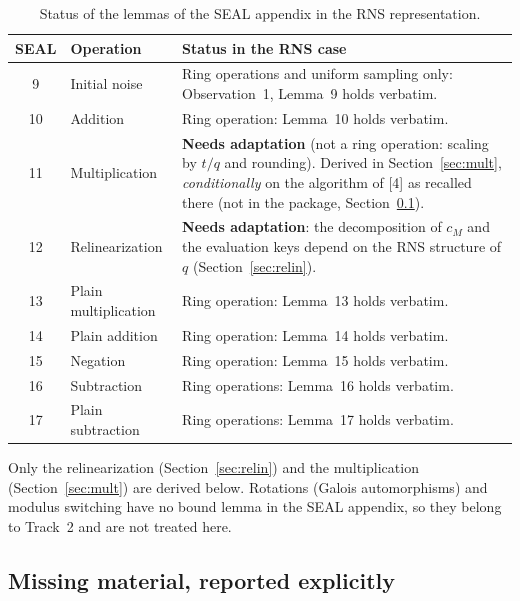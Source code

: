 \documentclass[11pt]{article}
\theoremstyle{plain}
\theoremstyle{definition}
\theoremstyle{remark}
\begin{document}
\begin{table}[ht]
\centering
\renewcommand{\arraystretch}{1.3}
\begin{tabular}{|c|l|p{9.2cm}|}
\hline
\textbf{SEAL} & \textbf{Operation} & \textbf{Status in the RNS case}\\
\hline
9  & Initial noise        & Ring operations and uniform sampling only: Observation~1, Lemma~9 holds verbatim.\\
\hline
10 & Addition             & Ring operation: Lemma~10 holds verbatim.\\
\hline
11 & Multiplication       & \textbf{Needs adaptation} (not a ring operation: scaling by $t/q$ and rounding). Derived in Section~\ref{sec:mult}, \emph{conditionally} on the algorithm of [4] as recalled there (not in the package, Section~\ref{sec:missing}).\\
\hline
12 & Relinearization      & \textbf{Needs adaptation}: the decomposition of $c_M$ and the evaluation keys depend on the RNS structure of $q$ (Section~\ref{sec:relin}).\\
\hline
13 & Plain multiplication & Ring operation: Lemma~13 holds verbatim.\\
\hline
14 & Plain addition       & Ring operation: Lemma~14 holds verbatim.\\
\hline
15 & Negation             & Ring operation: Lemma~15 holds verbatim.\\
\hline
16 & Subtraction          & Ring operations: Lemma~16 holds verbatim.\\
\hline
17 & Plain subtraction    & Ring operations: Lemma~17 holds verbatim.\\
\hline
\end{tabular}
\caption{Status of the lemmas of the SEAL appendix in the RNS representation.}
\label{tab:status}
\end{table}

Only the relinearization (Section~\ref{sec:relin}) and the multiplication (Section~\ref{sec:mult}) are derived below. Rotations (Galois automorphisms) and
modulus switching have no bound lemma in the SEAL appendix, so they belong to
Track~2 and are not treated here.

\subsection{Missing material, reported explicitly}
\label{sec:missing}
\end{document}

